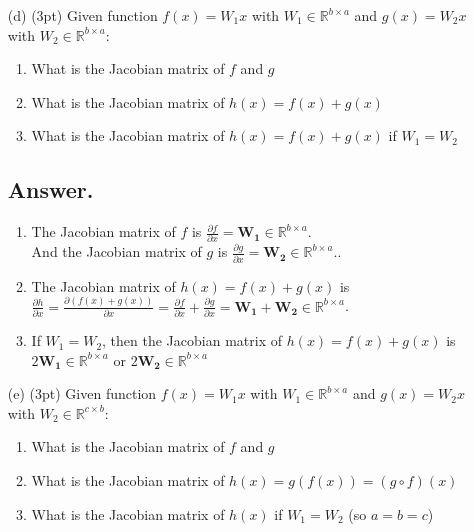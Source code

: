 \documentclass{article}
\begin{document}
\begin{itemize}
    \item[(d)] (3pt) Given function $f(x) = W_1 x$ with $W_1 \in \mathbb{R}^{b \times a}$ and $g(x) = W_2 x$ with $W_2 \in \mathbb{R}^{b \times a}$:
    \begin{enumerate}
        \item What is the Jacobian matrix of $f$ and $g$
        \item What is the Jacobian matrix of $h(x) = f(x) + g(x)$
        \item What is the Jacobian matrix of $h(x) = f(x) + g(x)$ if $W_1 = W_2$
    \end{enumerate}
    \subsection*{Answer.}
    \begin{enumerate}
        \item The Jacobian matrix of \(f\) is \(\frac{\partial f}{\partial x} = \mathbf{W_1} \in \mathbb{R}^{b \times a}\).\\
        And the Jacobian matrix of \(g\) is \(\frac{\partial g}{\partial x} = \mathbf{W_2} \in \mathbb{R}^{b \times a}\)..
        \item The Jacobian matrix of \(h(x) = f(x) + g(x)\) is \(\frac{\partial h}{\partial x} = \frac{\partial (f(x) + g(x))}{\partial x} = \frac{\partial f}{\partial x} + \frac{\partial g}{\partial x} = \mathbf{W_1} + \mathbf{W_2} \in \mathbb{R}^{b \times a}\).
        \item If \(W_1 = W_2\), then the Jacobian matrix of \(h(x) = f(x) + g(x)\) is \(2\mathbf{W_1} \in \mathbb{R}^{b \times a}\) or \(2\mathbf{W_2} \in \mathbb{R}^{b \times a}\)
    \end{enumerate}
    
    
    \item[(e)] (3pt) Given function $f(x) = W_1 x$ with $W_1 \in \mathbb{R}^{b \times a}$ and $g(x) = W_2 x$ with $W_2 \in \mathbb{R}^{c \times b}$:
    \begin{enumerate}
        \item What is the Jacobian matrix of $f$ and $g$
        \item What is the Jacobian matrix of $h(x) = g(f(x)) = (g \circ f)(x)$
        \item What is the Jacobian matrix of $h(x)$ if $W_1 = W_2$ (so $a = b = c$)
    \end{enumerate}

\end{itemize}
\end{document}

